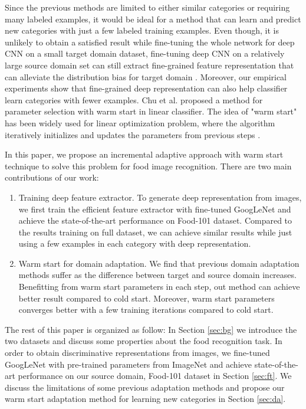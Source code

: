 Since the previous methods are limited to either similar categories or requiring many labeled examples, it would be ideal for a method that can learn and predict new categories with just a few labeled training examples. Even though, it is unlikely to obtain a satisfied result while fine-tuning the whole network for deep CNN on a small target domain dataset, fine-tuning deep CNN on a relatively large source domain set can still extract fine-grained feature representation that can alleviate the distribution bias for target domain \cite{zhang2014part}. Moreover, our empirical experiments show that fine-grained deep representation can also help classifier learn categories with fewer examples.
Chu et al. proposed a method for parameter selection with warm start in linear classifier\cite{chuwarm}.
The idea of "warm start" has been widely used for linear optimization problem, where the algorithm iteratively initializes and updates the parameters from previous steps \cite{yildirim2002warm} \cite{john2008implementation} \cite{zeilinger2011real}.
 
 In this paper, we propose an incremental adaptive approach with warm start technique to solve this problem for food image recognition. %
There are two main contributions of our work:
\begin{enumerate}
  \item Training deep feature extractor. To generate deep representation from images, we first train the efficient feature extractor with fine-tuned GoogLeNet and achieve the state-of-the-art performance on Food-101 dataset. Compared to the results training on full dataset, we can achieve similar results while just using a few examples in each category with deep representation.
  \item Warm start for domain adaptation. We find that previous domain adaptation methods suffer as the difference between target and source domain increases. Benefitting from warm start parameters in each step, out method can achieve better result compared to cold start. Moreover, warm start parameters converges better with a few training iterations compared to cold start.
\end{enumerate}

The rest of this paper is organized as follow: In Section \ref{sec:bg} we introduce the two datasets and discuss some properties about the food recognition task. In order to obtain discriminative representations from images, we fine-tuned GoogLeNet with pre-trained parameters from ImageNet and achieve state-of-the-art performance on our source domain, Food-101 dataset in Section \ref{sec:ft}. We discuss the limitations of some previous adaptation methods and propose our warm start adaptation method for learning new categories in Section \ref{sec:da}. 